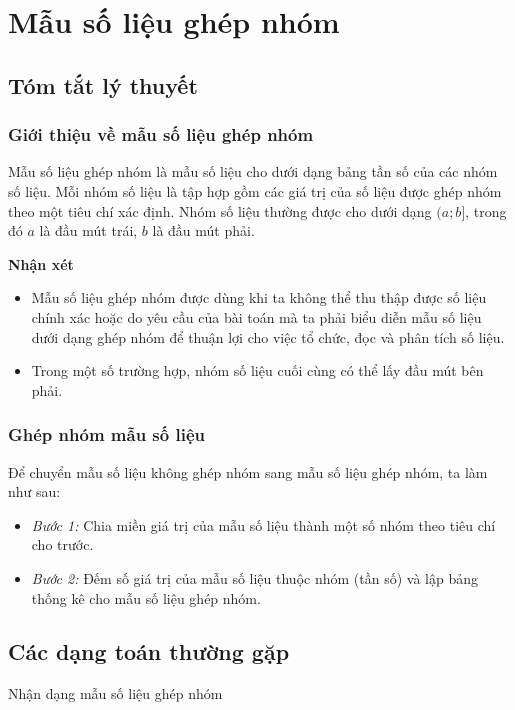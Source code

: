 \setcounter{section}{7}
\section{Mẫu số liệu ghép nhóm}
\subsection{Tóm tắt lý thuyết}
\begin{tomtat}
\subsubsection{Giới thiệu về mẫu số liệu ghép nhóm}
\begin{dn}
	Mẫu số liệu ghép nhóm là mẫu số liệu cho dưới dạng bảng tần số của các nhóm số liệu. Mỗi nhóm số liệu là tập hợp gồm các giá trị của số liệu được ghép nhóm theo một tiêu chí xác định. Nhóm số liệu thường được cho dưới dạng $(a;b]$, trong đó $a$ là đầu mút trái, $b$ là đầu mút phải.
\end{dn}
\textbf{Nhận xét}
\begin{itemize}
	\item Mẫu số liệu ghép nhóm được dùng khi ta không thể thu thập được số liệu chính xác hoặc do yêu cầu của bài toán mà ta phải biểu diễn mẫu số liệu dưới dạng ghép nhóm để thuận lợi cho việc tổ chức, đọc và phân tích số liệu.
	\item Trong một số trường hợp, nhóm số liệu cuối cùng có thể lấy đầu mút bên phải.
\end{itemize}	
\subsubsection{Ghép nhóm mẫu số liệu}
Để chuyển mẫu số liệu không ghép nhóm sang mẫu số liệu ghép nhóm, ta làm như sau:
\begin{itemize}
	\item \textit{Bước 1:} Chia miền giá trị của mẫu số liệu thành một số nhóm theo tiêu chí cho trước.
	\item \textit{Bước 2:} Đếm số giá trị của mẫu số liệu thuộc nhóm (tần số) và lập bảng thống kê cho mẫu số liệu ghép nhóm.
\end{itemize}
\end{tomtat}
\subsection{Các dạng toán thường gặp}
\begin{dang}{Nhận dạng mẫu số liệu ghép nhóm}
	
\end{dang}
